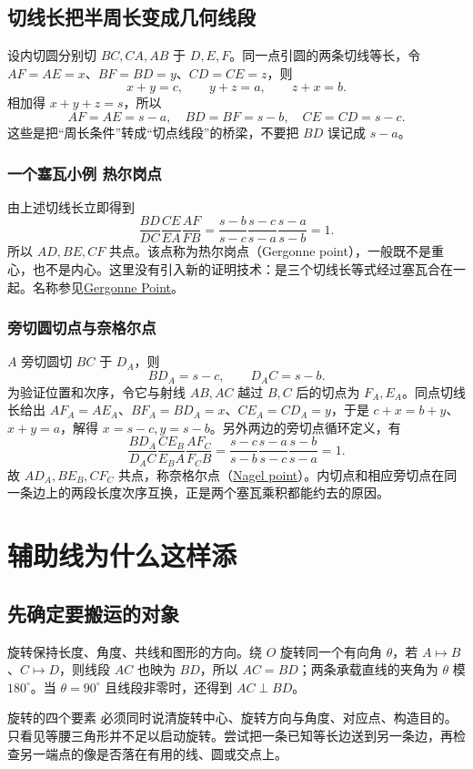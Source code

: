 \documentclass[lang=cn,12pt,fontset=none,a4paper,openany]{beautybook}
\begin{document}
\section{切线长把半周长变成几何线段}
设内切圆分别切 $BC,CA,AB$ 于 $D,E,F$。同一点引圆的两条切线等长，令
$AF=AE=x$、$BF=BD=y$、$CD=CE=z$，则
\[
 x+y=c,\qquad y+z=a,\qquad z+x=b.
\]
相加得 $x+y+z=s$，所以
\[
 AF=AE=s-a,\quad BD=BF=s-b,\quad CE=CD=s-c.
\]
这些是把“周长条件”转成“切点线段”的桥梁，不要把 $BD$ 误记成 $s-a$。

\subsection{一个塞瓦小例 热尔岗点}
由上述切线长立即得到
\[
 \frac{BD}{DC}\frac{CE}{EA}\frac{AF}{FB}
 =\frac{s-b}{s-c}\frac{s-c}{s-a}\frac{s-a}{s-b}=1.
\]
所以 $AD,BE,CF$ 共点。该点称为热尔岗点（Gergonne point），一般既不是重心，也不是内心。这里没有引入新的证明技术：是三个切线长等式经过塞瓦合在一起。名称参见\href{https://mathworld.wolfram.com/GergonnePoint.html}{Gergonne Point}。

\subsection{旁切圆切点与奈格尔点}
$A$ 旁切圆切 $BC$ 于 $D_A$，则
\[
 BD_A=s-c,\qquad D_AC=s-b.
\]
为验证位置和次序，令它与射线 $AB,AC$ 越过 $B,C$ 后的切点为 $F_A,E_A$。同点切线长给出 $AF_A=AE_A$、$BF_A=BD_A=x$、$CE_A=CD_A=y$，于是 $c+x=b+y$、$x+y=a$，解得 $x=s-c,y=s-b$。另外两边的旁切点循环定义，有
\[
 \frac{BD_A}{D_AC}\frac{CE_B}{E_BA}\frac{AF_C}{F_CB}
 =\frac{s-c}{s-b}\frac{s-a}{s-c}\frac{s-b}{s-a}=1.
\]
故 $AD_A,BE_B,CF_C$ 共点，称奈格尔点（\href{https://mathworld.wolfram.com/NagelPoint.html}{Nagel point}）。内切点和相应旁切点在同一条边上的两段长度次序互换，正是两个塞瓦乘积都能约去的原因。

\chapter{辅助线为什么这样添}
\section{先确定要搬运的对象}
旋转保持长度、角度、共线和图形的方向。绕 $O$ 旋转同一个有向角 $\theta$，若 $A\mapsto B$、$C\mapsto D$，则线段 $AC$ 也映为 $BD$，所以 $AC=BD$；两条承载直线的夹角为 $\theta$ 模 $180^\circ$。当 $\theta=90^\circ$ 且线段非零时，还得到 $AC\perp BD$。

\begin{keybox}{旋转的四个要素}
必须同时说清旋转中心、旋转方向与角度、对应点、构造目的。只看见等腰三角形并不足以启动旋转。尝试把一条已知等长边送到另一条边，再检查另一端点的像是否落在有用的线、圆或交点上。
\end{keybox}
\end{document}
